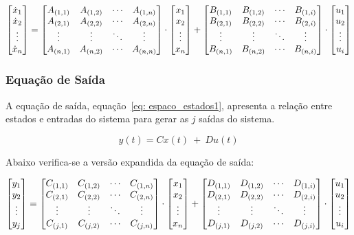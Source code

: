 \begin{equation}\label{eq: estados_expandida0}
\left[ \begin{matrix}
    \dot{x}_1 \cr \dot{x}_2 \cr  \vdots \cr \dot{x}_n 
\end{matrix} \right]
=  
\left[ \begin{matrix} 
A_{(1,1)} & A_{(1,2)} & \cdots  & A_{(1,n)}\cr
A_{(2,1)} & A_{(2,2)} & \cdots  & A_{(2,n)}\cr
\vdots    & \vdots    & \ddots  & \vdots   \cr
A_{(n,1)} & A_{(n,2)} & \cdots  & A_{(n,n)}\cr
\end{matrix} \right] \cdot
\left[ \begin{matrix}
    x_1 \cr x_2 \cr  \vdots \cr x_n 
\end{matrix} \right] +
\left[ \begin{matrix} 
B_{(1,1)} & B_{(1,2)} & \cdots  & B_{(1,i)}\cr
B_{(2,1)} & B_{(2,2)} & \cdots  & B_{(2,i)}\cr
\vdots    & \vdots    & \ddots  & \vdots   \cr
B_{(n,1)} & B_{(n,2)} & \cdots  & B_{(n,i)}\cr
\end{matrix} \right] \cdot
\left[ \begin{matrix}
    u_1 \cr u_2 \cr  \vdots \cr u_i 
\end{matrix} \right] 
\end{equation}

\subsubsection{Equação de Saída}

A equação de saída, equação~\ref{eq: espaco_estados1}, apresenta a relação entre estados e entradas do sistema para gerar as $j$ saídas do sistema.

\begin{equation} \label{eq: espaco_estados1}
     y(t) = Cx(t){~}+{~}Du(t)
\end{equation}

Abaixo verifica-se a versão expandida da equação de saída:

\begin{equation}\label{eq: estados_expandida1}
\left[ \begin{matrix}
    y_1 \cr y_2 \cr  \vdots \cr y_j 
\end{matrix} \right]
=  
\left[ \begin{matrix} 
C_{(1,1)} & C_{(1,2)} & \cdots  & C_{(1,n)}\cr
C_{(2,1)} & C_{(2,2)} & \cdots  & C_{(2,n)}\cr
\vdots    & \vdots    & \ddots  & \vdots   \cr
C_{(j,1)} & C_{(j,2)} & \cdots  & C_{(j,n)}\cr
\end{matrix} \right] \cdot
\left[ \begin{matrix}
    x_1 \cr x_2 \cr  \vdots \cr x_n 
\end{matrix} \right] +
\left[ \begin{matrix} 
D_{(1,1)} & D_{(1,2)} & \cdots  & D_{(1,i)}\cr
D_{(2,1)} & D_{(2,2)} & \cdots  & D_{(2,i)}\cr
\vdots    & \vdots    & \ddots  & \vdots   \cr
D_{(j,1)} & D_{(j,2)} & \cdots  & D_{(j,i)}\cr
\end{matrix} \right] \cdot
\left[ \begin{matrix}
    u_1 \cr u_2 \cr  \vdots \cr u_i 
\end{matrix} \right] 
\end{equation}

